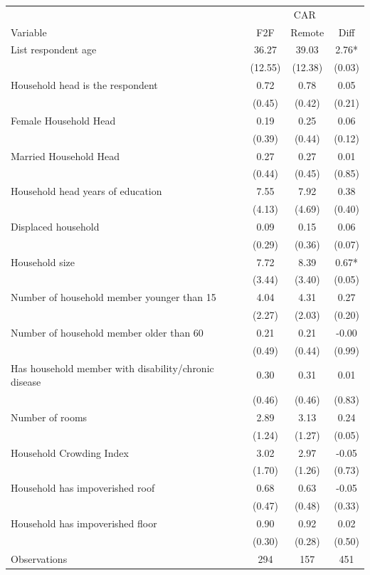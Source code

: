 \begin{tabular}{l*{3}c}
\hline\hline
 & \multicolumn{3}{c}{CAR}\\ 
Variable & F2F & Remote & Diff \\
\hline
List respondent age&36.27&39.03&2.76*\\
&(12.55)&(12.38)&(0.03)\\
Household head is the respondent&0.72&0.78&0.05\\
&(0.45)&(0.42)&(0.21)\\
Female Household Head&0.19&0.25&0.06\\
&(0.39)&(0.44)&(0.12)\\
Married Household Head&0.27&0.27&0.01\\
&(0.44)&(0.45)&(0.85)\\
Household head years of education&7.55&7.92&0.38\\
&(4.13)&(4.69)&(0.40)\\
Displaced household&0.09&0.15&0.06\\
&(0.29)&(0.36)&(0.07)\\
Household size&7.72&8.39&0.67*\\
&(3.44)&(3.40)&(0.05)\\
Number of household member younger than 15&4.04&4.31&0.27\\
&(2.27)&(2.03)&(0.20)\\
Number of household member older than 60&0.21&0.21&-0.00\\
&(0.49)&(0.44)&(0.99)\\
Has household member with disability/chronic disease&0.30&0.31&0.01\\
&(0.46)&(0.46)&(0.83)\\
Number of rooms&2.89&3.13&0.24\\
&(1.24)&(1.27)&(0.05)\\
Household Crowding Index&3.02&2.97&-0.05\\
&(1.70)&(1.26)&(0.73)\\
Household has impoverished roof&0.68&0.63&-0.05\\
&(0.47)&(0.48)&(0.33)\\
Household has impoverished floor&0.90&0.92&0.02\\
&(0.30)&(0.28)&(0.50)\\
\hline
Observations & 294 & 157 & 451 \\
\hline\hline
\end{tabular}
